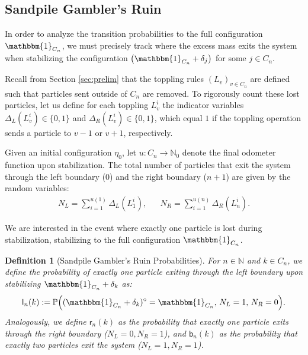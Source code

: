 \documentclass[11pt]{article}
\newtheorem{definition}{Definition}[section]
\newcommand{\prob}{\mathbb{P}}
\newcommand{\sgrleft}[2]{\mathsf{l}_{#1}(#2)}
\newcommand{\sgrright}[2]{\mathsf{r}_{#1}(#2)}
\newcommand{\sgrboth}[2]{\mathsf{b}_{#1}(#2)}
\begin{document}
\subsection{Sandpile Gambler's Ruin}\label{sec:gambler}
In order to analyze the transition probabilities to the full configuration $\mathbbm{1}_{C_n}$, we must precisely track where the excess mass exits the system when stabilizing the configuration $\big(\mathbbm{1}_{C_n} + \delta_j\big)$ for some $j \in C_n$. 

Recall from Section \ref{sec:prelim} that the toppling rules $(L_v)_{v\in C_n}$ are defined such that particles sent outside of $C_n$ are removed. To rigorously count these lost particles, let us define for each toppling $L_v^i$ the indicator variables $\Delta_L(L_v^i) \in \{0,1\}$ and $\Delta_R(L_v^i) \in \{0,1\}$, which equal $1$ if the toppling operation sends a particle to $v-1$ or $v+1$, respectively.

Given an initial configuration $\eta_0$, let $u : C_n \to \mathbb{N}_0$ denote the final odometer function upon stabilization. The total number of particles that exit the system through the left boundary ($0$) and the right boundary ($n+1$) are given by the random variables:
\begin{align*}
    N_L = \sum_{i=1}^{u(1)} \Delta_L(L_1^i), &&
    N_R = \sum_{i=1}^{u(n)} \Delta_R(L_n^i).
\end{align*}

We are interested in the event where exactly one particle is lost during stabilization, stabilizing to the full configuration $\mathbbm{1}_{C_n}$.

\begin{definition}[Sandpile Gambler's Ruin Probabilities]
For $n \in \mathbb{N}$ and $k \in C_n$, we define the probability of exactly one particle exiting through the left boundary upon stabilizing $\mathbbm{1}_{C_n} + \delta_k$ as:
\begin{equation*}
    \sgrleft{n}{k} := \prob\Big( (\mathbbm{1}_{C_n} + \delta_k)^\circ = \mathbbm{1}_{C_n}, \, N_L = 1, \, N_R = 0 \Big).
\end{equation*}
Analogously, we define $\sgrright{n}{k}$ as the probability that exactly one particle exits through the right boundary ($N_L = 0, N_R = 1$), and $\sgrboth{n}{k}$ as the probability that exactly two particles exit the system ($N_L = 1, N_R = 1$).
\end{definition}
\end{document}
